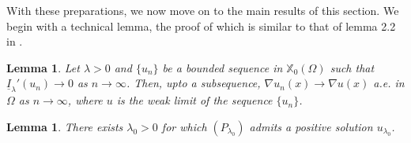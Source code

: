\documentclass[reqno,oneside]{amsart}
\newtheorem{lemma}[theorem]{Lemma}
\theoremstyle{definition}
\theoremstyle{remark}
\numberwithin{equation}{section}
\newcommand{\Om} {\Omega}
\newcommand{\rar}{\rightarrow}
\newcommand{\na} {\nabla}
\newcommand{\xo}{\mathbb{X}_0}
\newcommand{\il}{\underline{I}}
\newcommand{\la} {\lambda}
\begin{document}
With these preparations, we now move on to the main results of this section. We begin with a technical lemma, the proof of which is similar to that of lemma 2.2 in \cite{silva2024mixed}.

\begin{lemma}\label{pointwise_convergence_of_gradient}
    Let $\la>0$ and $\{u_n\}$ be a bounded sequence in $\xo(\Om)$ such that $\il_{\la}' (u_n) \rar 0$ as $n\rar\infty$. Then, upto a subsequence, $\na u_n (x) \rar \na u(x)$ a.e. in $\Om$ as $n\rar\infty$, where $u$ is the weak limit of the sequence $\{u_n\}$.
\end{lemma}

\begin{lemma}\label{solution for lambda_0}
    There exists $\la_0>0$ for which $(P_{\la_0})$ admits a positive solution $u_{\la_0}$.
\end{lemma}
\end{document}
